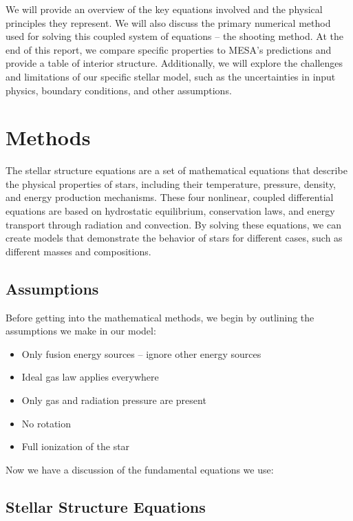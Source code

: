 \documentclass[twocolumn]{aastex631}
\begin{document}
We will provide an overview of the key equations involved and the physical principles they represent. We will also discuss the primary numerical method used for solving this coupled system of equations -- the shooting method. At the end of this report, we compare specific properties to MESA's predictions and provide a table of interior structure. Additionally, we will explore the challenges and limitations of our specific stellar model, such as the uncertainties in input physics, boundary conditions, and other assumptions.

\section{Methods} \label{sec:method}

The stellar structure equations are a set of mathematical equations that describe the physical properties of stars, including their temperature, pressure, density, and energy production mechanisms. These four nonlinear, coupled differential equations are based on hydrostatic equilibrium, conservation laws, and energy transport through radiation and convection. By solving these equations, we can create models that demonstrate the behavior of stars for different cases, such as different masses and compositions.

\subsection{Assumptions}

Before getting into the mathematical methods, we begin by outlining the assumptions we make in our model:

\begin{itemize}
	\item Only fusion energy sources -- ignore other energy sources
	\item Ideal gas law applies everywhere
	\item Only gas and radiation pressure are present
	\item No rotation
	\item Full ionization of the star
\end{itemize}

Now we have a discussion of the fundamental equations we use:

\subsection{Stellar Structure Equations}
\end{document}
